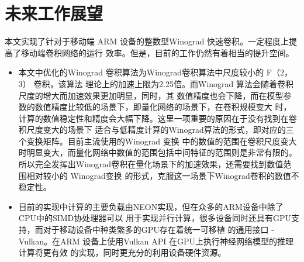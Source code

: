 \section{未来工作展望}

本文实现了针对于移动端 ARM 设备的整数型Winograd 快速卷积。一定程度上提高了移动端卷积网络的运行
效率。但是，目前的工作仍然有着相当的提升空间。

\begin{itemize}
    \item 本文中优化的Winograd 卷积算法为Winograd卷积算法中尺度较小的 F（2，3） 卷积，该算法
    理论上的加速上限为2.25倍。而Winograd 算法会随着卷积尺度的增大而加速效果更加明显，同时，其
    数值精度也会下降，而在模型参数的数值精度比较低的场景下，即量化网络的场景下，在卷积规模变大
    时，计算的数值稳定性和精度会大幅下降。这里一项重要的原因在于没有找到在卷积尺度变大的场景下
    适合与低精度计算的Winograd算法的形式，即对应的三个变换矩阵。目前主流使用的Winograd 变换
    中的数值的范围在卷积尺度变大时明显变大，而量化网络中数值的范围包括中间特征的范围则是非常有限的。
    所以完全发挥出Winograd卷积在量化场景下的加速效果，还需要找到数值范围相对较小的 Winograd变换
    的形式，克服这一场景下Winograd卷积的数值不稳定性。
    \item 目前的实现中计算的主要负载由NEON实现，但在众多的ARM设备中除了CPU中的SIMD协处理器可以
    用于实现并行计算，很多设备同时还具有GPU支持，而对于移动设备中种类繁多的GPU存在着统一可移植
    的通用接口 - Vulkan。在ARM 设备上使用Vulkan API 在GPU上执行神经网络模型的推理计算将更有效
    的实现，同时更充分的利用设备硬件资源。
\end{itemize}